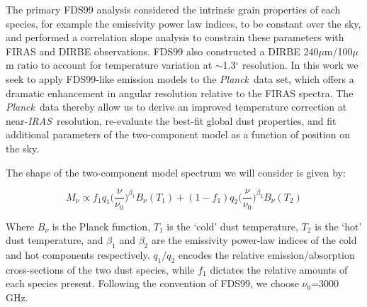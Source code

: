 \documentclass{emulateapj}
\newcommand{\IRAS}{{\it IRAS}}
\newcommand{\PLANCK}{{\it Planck}}
\begin{document}
The primary FDS99 analysis considered the intrinsic grain properties of each
species, for example the emissivity power law indices, to be constant over the 
sky, and performed a correlation slope analysis to constrain these parameters 
with FIRAS and DIRBE observations. FDS99 also constructed a DIRBE 
240$\mu$m/100$\mu$m ratio to account for temperature variation at 
$\sim$1.3$^{\circ}$ resolution. In this work we seek to apply FDS99-like 
emission models to the \PLANCK~data set, which offers a dramatic enhancement in
angular resolution relative to the FIRAS spectra. The \PLANCK~data thereby 
allow us to derive an improved temperature correction at near-\IRAS~resolution,
re-evaluate the best-fit global dust properties, and fit additional parameters 
of the two-component model as a function of position on the sky. 





The shape of the two-component model spectrum we will consider is given by:

\begin{equation}
M_{\nu} \propto f_{1}q_{1}\Big(\frac{\nu}{\nu_{0}}\Big)^{\beta_1}B_{\nu}(T_1) + (1-f_{1})q_{2}\Big(\frac{\nu}{\nu_0}\Big)^{\beta_2}B_{\nu}(T_2)
\end{equation}

 


Where $B_{\nu}$ is the Planck function, $T_1$ is the `cold' dust temperature, 
$T_2$ is the `hot' dust temperature, and $\beta_1$ and $\beta_2$ are the
emissivity power-law indices of the cold and hot components respectively. 
$q_1/q_2$ encodes the relative emission/absorption cross-sections of the two 
dust species, while $f_1$ dictates the relative amounts of each species 
present. Following the convention of FDS99, we choose $\nu_0$=3000 GHz. 
\end{document}
